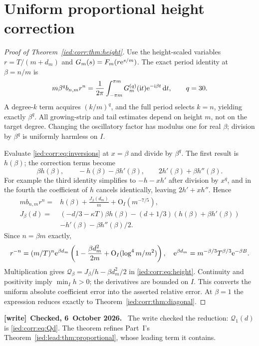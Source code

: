 \documentclass[11pt,letterpaper]{article}
\theoremstyle{remark}\newtheorem{remark}[theorem]{Remark}
\newcommand{\ii}{\mathrm i}\newcommand{\dd}{\,\mathrm d}
\newcommand{\Oh}{\mathrm O}\newcommand{\supp}{\operatorname{supp}}
\newenvironment{writenote}[1][]{\par\smallskip\begingroup\small
 \noindent\textbf{[write]}\if\relax\detokenize{#1}\relax\else~\textbf{#1.}\fi\ }%
 {\par\endgroup\smallskip}
\begin{document}
\section{Uniform proportional height correction}\label{ied:corr:sec:height}
\begin{proof}[Proof of Theorem~\ref{ied:corr:thm:height}]
Use the height-scaled variables $r=T/(m+d_m)$ and $G_m(s)=F_m(r\mathrm e^{s/m})$. The exact period identity at $\beta=n/m$ is
\begin{equation}\label{ied:corr:eq:betaextract}
 m\beta^q b_{n,m}r^n=\frac1{2\pi}\int_{-\pi m}^{\pi m}
          G_m^{(q)}(\ii t)\e^{-\ii\beta t}\dd t,\qquad q=30.
\end{equation}
A degree-$k$ term acquires $(k/m)^q$, and the full period selects $k=n$, yielding exactly $\beta^q$. All growing-strip and tail estimates depend on height $m$, not on the target degree. Changing the oscillatory factor has modulus one for real $\beta$; division by $\beta^q$ is uniformly harmless on $I$.

Evaluate \eqref{ied:corr:eq:inversions} at $x=\beta$ and divide by $\beta^q$. The first result is $h(\beta)$; the correction terms become
\[
 \beta h(\beta),\qquad -h(\beta)-\beta h'(\beta),\qquad
 2h'(\beta)+\beta h''(\beta).
\]
For example the third identity simplifies to $-h-xh'$ after division by $x^q$, and in the fourth the coefficient of $h$ cancels identically, leaving $2h'+xh''$. Hence
\begin{align*}
 m b_{n,m}r^n={}&h(\beta)+\frac{J_\beta(d_m)}m+\Oh_I(m^{-7/5}),\\
 J_\beta(d)={}&(-d/3-\kappa T)\beta h(\beta)
 -(d+1/3)(h(\beta)+\beta h'(\beta))\\
 &-h'(\beta)-\beta h''(\beta)/2.
\end{align*}
Since $n=\beta m$ exactly,
\[
 r^{-n}=(m/T)^n\e^{\beta d_m}
 \left(1-\frac{\beta d_m^2}{2m}+\Oh_I(\log^4m/m^2)\right),
 \quad \e^{\beta d_m}=m^{-\beta/3}T^{\beta/3}\e^{-\beta B}.
\]
Multiplication gives $\mathcal Q_\beta=J_\beta/h-\beta d_m^2/2$ in \eqref{ied:corr:eq:height}. Continuity and positivity imply $\min_Ih>0$; the derivatives are bounded on $I$. This converts the uniform absolute coefficient error into the asserted relative error. At $\beta=1$ the expression reduces exactly to Theorem~\ref{ied:corr:thm:diagonal}.
\end{proof}

\begin{writenote}[Checked, 6~October 2026]
The write checked the reduction: $\mathcal Q_1(d)$ is \eqref{ied:corr:eq:Qd}. The theorem refines Part~I's Theorem~\ref{ied:lead:thm:proportional}, whose leading term it contains.
\end{writenote}
\end{document}
